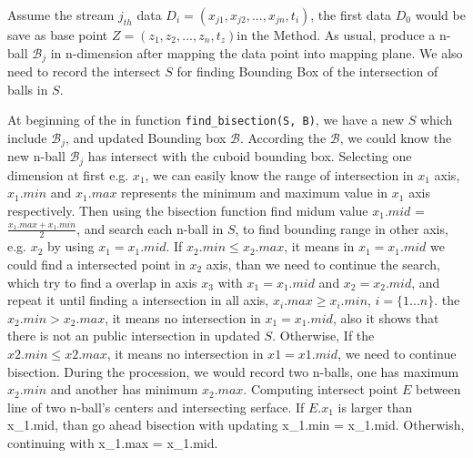 \documentclass{report}
\begin{document}
Assume the stream $j_{th}$ data	
$D_i = (x_{j1}, x_{j2}, ..., x_{jn},t_i)$, the first data $D_0$ would	
be save as base point $Z=(z_{1}, z_{2}, ..., z_{n},t_z)$in the Method.	
As usual, produce a n-ball ${\mathcal{B}_j}$ in n-dimension after mapping the data point into mapping plane.
We also need to record the intersect $S$ for finding Bounding Box of the intersection of balls in $S$.

At beginning of the in function \texttt{find\_bisection(S, B)}, we have a new $S$ which include $\mathcal{B}_j$, and updated Bounding box $\mathcal{B}$. According the $\mathcal{B}$, we could know the new n-ball $\mathcal{B}_j$ has intersect with the cuboid bounding box. Selecting one dimension at first e.g. $x_1$, we can easily know the range of intersection in $x_1$ axis, $x_1.min$ and $x_1.max$ represents the minimum and maximum value in $x_1$ axis respectively. Then using the bisection function find midum value $x_1.mid$ = $\frac{x_1.max + x_1.min}{2}$, and search each n-ball in $S$, to find bounding range in other axis, e.g. $x_2$ by using $x_1 = x_1.mid$. If $x_2.min \leqslant x_2.max$, it means in $x_1 = x_1.mid$ we could find a intersected point in $x_2$ axis, than we need to continue the search, which try to find a overlap in axis $x_3$ with $x_1 = x_1.mid$ and $x_2 = x_2.mid$, and repeat it until finding a intersection in all axis, $x_i.max \geqslant x_i.min$, $i = \{1...n \}$. the $x_2.min > x_2.max$, it means no intersection in $x_1 = x_1.mid$, also it shows that there is not an public intersection in updated $S$. Otherwise,  If the $x2.min \leqslant x2.max$,  it means no intersection in $x1=x1.mid$, we need to continue bisection. During the procession, we would record two n-balls, one has maximum $x_2.min$ and another has minimum $x_2.max$. Computing intersect point $E$ between line of two n-ball's centers and intersecting serface. If $E.x_1$ is larger than x_1.mid, than go ahead bisection with updating x_1.min = x_1.mid. Otherwish, continuing with x_1.max = x_1.mid.
\end{document}

